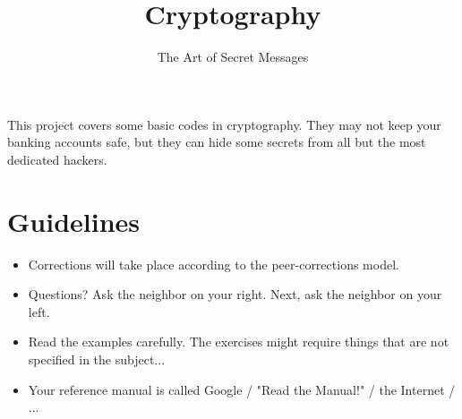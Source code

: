 \documentclass{42-en}
\begin{document}
\title{Cryptography}
\subtitle{The Art of Secret Messages}


\summary
{
	This project covers some basic codes in cryptography. They may not keep your banking accounts safe, but they can hide some secrets from all but the most dedicated hackers.
}

\maketitle

\tableofcontents



\chapter{Guidelines}

\begin{itemize}

  \item Corrections will take place according to the peer-corrections model.
 
  \item Questions? Ask the neighbor on your right. Next, ask the neighbor on your left.
  
  \item Read the examples carefully. The exercises might require things that are not specified in the subject...

  \item Your reference manual is called Google / "Read the Manual!" / the Internet / ...

\end{itemize}

\newpage


\end{document}
